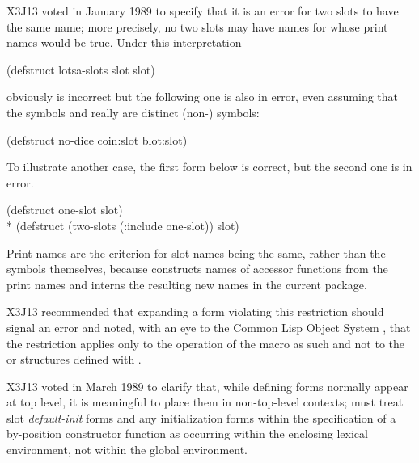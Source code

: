 \begin{defmac}
\begin{new}
X3J13 voted in January 1989
to specify that it is an error for
two slots to have the same name; more precisely, no two slots may
have names for whose print names  would be true.
Under this interpretation
\begin{lisp}
(defstruct lotsa-slots slot slot)
\end{lisp}
obviously is incorrect
but the following one is also in error, even assuming that the symbols
 and  really are distinct (non-) symbols:
\begin{lisp}
(defstruct no-dice coin:slot blot:slot)
\end{lisp}
To illustrate another case, the first  form below is
correct, but the second one is in error.
\begin{lisp}
(defstruct one-slot slot) \\*
(defstruct (two-slots (:include one-slot)) slot)
\end{lisp}

\beforenoterule
\begin{rationale}
Print names are the criterion for slot-names being the same, rather
than the symbols themselves, because  constructs names
of accessor functions from the print names and interns the resulting
new names in the current package.
\end{rationale}
\afternoterule


X3J13 recommended that expanding
a  form violating this
restriction should signal an error and noted, with an eye to the Common Lisp
Object System
, that the restriction applies only to the operation of the
 macro as such and not to the  or
structures defined with .
\end{new}

\begin{newer}
X3J13 voted in March 1989 
to clarify that, while defining forms normally appear at top level,
it is meaningful to place them in non-top-level contexts;
 must treat slot {\it default-init} forms
and any
initialization forms within the specification of a by-position
constructor function as occurring
within the enclosing lexical environment, not within the global
environment.
\end{newer}


\end{defmac}

